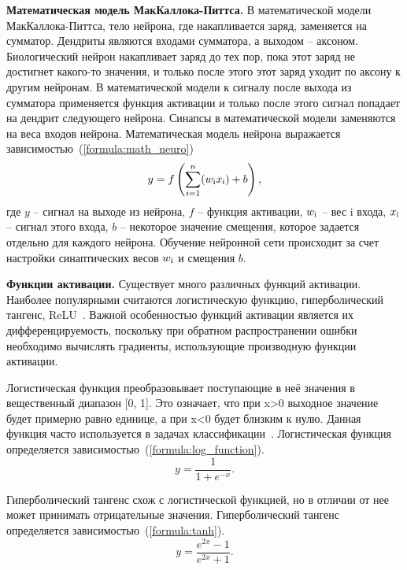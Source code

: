 \textbf{Математическая модель МакКаллока-Питтса.}
В математической модели МакКаллока-Питтса, тело нейрона, где накапливается заряд, заменяется на сумматор. 
Дендриты являются входами сумматора, а выходом -- аксоном. 
Биологический нейрон накапливает заряд до тех пор, пока этот заряд не достигнет какого-то значения, и только после этого этот заряд уходит по аксону к другим нейронам. 
В математической модели к сигналу после выхода из сумматора применяется функция активации и только после этого сигнал попадает на дендрит следующего нейрона. 
Синапсы в математической модели заменяются на веса входов нейрона. 
Математическая модель нейрона выражается зависимостью~(\ref{formula:math_neuro})
\begin{equation}\label{formula:math_neuro}
y = f\left(\sum\limits_{i = 1}^{n}(w_{\rm{i}}x_{\rm{i}}) + b\right),
\end{equation}
где $y$ -- сигнал на выходе из нейрона, $f$ -- функция активации, $w_{\rm{i}}$ -- вес i входа, $x_{\rm{i}}$ -- сигнал этого входа, $b$ -- некоторое значение смещения, которое задается отдельно для каждого нейрона.
Обучение нейронной сети происходит за счет настройки синаптических весов $w_{\rm{i}}$ и смещения $b$.

\textbf{Функции активации.}
Существует много различных функций активации.
Наиболее популярными считаются логистическую функцию, гиперболический тангенс, ReLU~\cite{activation_function}. Важной особенностью функций активации является их дифференцируемость, поскольку при обратном распространении ошибки необходимо вычислять градиенты, использующие производную функции активации.

Логистическая функция преобразовывает поступающие в неё значения в вещественный диапазон [0, 1]. 
Это означает, что при x>0 выходное значение будет примерно равно единице, а при x<0 будет близким к нулю. 
Данная функция часто используется в задачах классификации~\cite{activation_function}. 
Логистическая функция определяется зависимостью~(\ref{formula:log_function}).
\begin{equation}\label{formula:log_function}
y = \frac{1}{1 + e^{-x}}.
\end{equation}

Гиперболический тангенс схож с логистической функцией, но в отличии от нее может принимать отрицательные значения. 
Гиперболический тангенс определяется зависимостью~(\ref{formula:tanh}).
\begin{equation}\label{formula:tanh}
y = \frac{e^{2x} - 1}{e^{2x} + 1}.
\end{equation}

